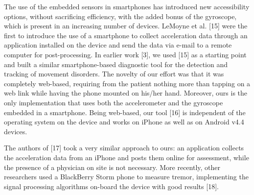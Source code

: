 The use of the embedded sensors in smartphones has introduced new accessibility options, without sacrificing efficiency, with the added bonus of the gyroscope, which is present in an increasing number of devices. LeMoyne et al. [15] were the first to introduce the use of a smartphone to collect acceleration data through an application installed on the device and send the data via e-mail to a remote computer for post-processing. 
In earlier work [3], we used [15] as a starting point and built a similar smartphone-based diagnostic tool for the detection and tracking of movement disorders. The novelty of our effort was that it was completely web-based, requiring from the patient nothing more than tapping on a web link while having the phone mounted on his/her hand. Moreover, ours is the only implementation that uses both the accelerometer and the gyroscope embedded in a smartphone. Being web-based, our tool [16] is independent of the operating system on the device and works on iPhone as well as on Android v4.4 devices. 

The authors of [17] took a very similar approach to ours: an application collects the acceleration data from an iPhone and posts them online for assessment, while the presence of a physician on site is not necessary. More recently, other researchers used a BlackBerry Storm phone to measure tremor, implementing the signal processing algorithms on-board the device with good results [18]. 


